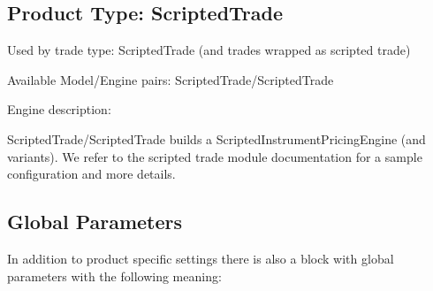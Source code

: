 \subsection{Product Type: ScriptedTrade}

Used by trade type: ScriptedTrade (and trades wrapped as scripted trade)

Available Model/Engine pairs: ScriptedTrade/ScriptedTrade

Engine description:

ScriptedTrade/ScriptedTrade builds a ScriptedInstrumentPricingEngine (and variants). We refer to the scripted trade
module documentation for a sample configuration and more details.

\subsection{Global Parameters}
\label{sec:pe-global-parameters}

In addition to product specific settings there is also a block with global parameters with the following meaning:

